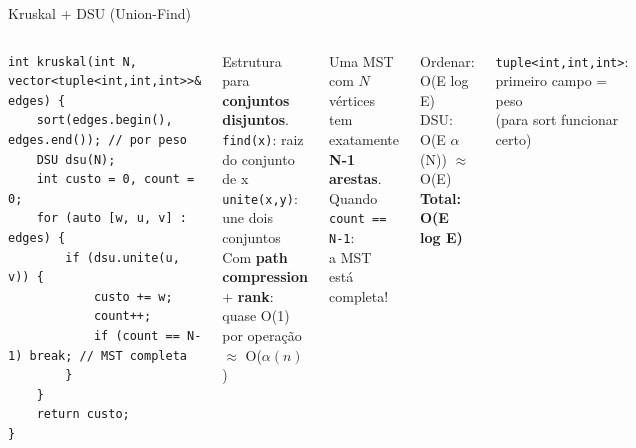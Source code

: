 \documentclass[aspectratio=169,10pt]{beamer}
\begin{document}
\begin{frame}[fragile,shrink=2]{Kruskal + DSU (Union-Find)}
\begin{columns}[t]
\begin{tcolorbox}[caixaCodigo]
\begin{lstlisting}[style=cppsmall]
int kruskal(int N, vector<tuple<int,int,int>>& edges) {
    sort(edges.begin(), edges.end()); // por peso
    DSU dsu(N);
    int custo = 0, count = 0;
    for (auto [w, u, v] : edges) {
        if (dsu.unite(u, v)) {
            custo += w;
            count++;
            if (count == N-1) break; // MST completa
        }
    }
    return custo;
}
        \end{lstlisting}
      \end{tcolorbox}
      \begin{tcolorbox}[caixaGrafo,title={DSU (Union-Find)}]
        \footnotesize
        Estrutura para \textbf{conjuntos disjuntos}.\\[3pt]
        \texttt{find(x)}: raiz do conjunto de x\\
        \texttt{unite(x,y)}: une dois conjuntos\\[3pt]
        Com \textbf{path compression} + \textbf{rank}:\\
        quase O(1) por operação $\approx$ O($\alpha(n)$)
      \end{tcolorbox}
      \vspace{0.07cm}
      \begin{tcolorbox}[caixaAmarelo,title={Invariante Kruskal}]
        \footnotesize
        Uma MST com $N$ vértices\\
        tem exatamente \textbf{N-1 arestas}.\\[3pt]
        Quando \texttt{count == N-1}:\\
        a MST está completa!
      \end{tcolorbox}
      \vspace{0.07cm}
      \begin{tcolorbox}[caixaVerde,title={Complexidade}]
        \footnotesize
        Ordenar: O(E log E)\\
        DSU: O(E $\alpha$(N)) $\approx$ O(E)\\[3pt]
        \textbf{Total: O(E log E)}
      \end{tcolorbox}
      \vspace{0.07cm}
      \begin{tcolorbox}[caixaVermelho,title={Atenção}]
        \footnotesize
        \texttt{tuple<int,int,int>}:\\
        primeiro campo = peso\\
        (para sort funcionar certo)
      \end{tcolorbox}
  \end{columns}
\end{frame}
\end{document}
